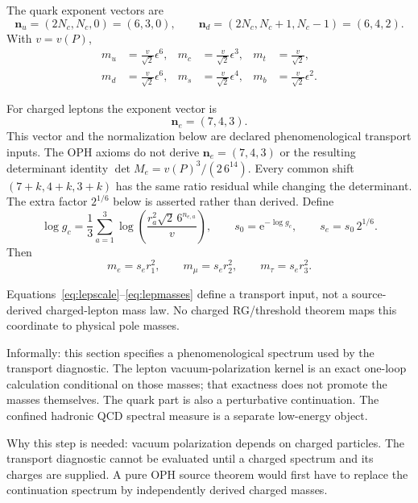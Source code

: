 \documentclass[11pt]{article}
\theoremstyle{remark}
\newcommand{\e}{\mathrm e}
\newcommand{\Nc}{N_c}
\begin{document}
The quark exponent vectors are
\begin{equation}
\bm n_u=(2\Nc,\Nc,0)=(6,3,0),
\qquad
\bm n_d=(2\Nc,\Nc+1,\Nc-1)=(6,4,2).
\label{eq:quarkexponents}
\end{equation}
With \(v=v(P)\),
\begin{align}
m_u&=\frac{v}{\sqrt2}\epsilon^6,
&
m_c&=\frac{v}{\sqrt2}\epsilon^3,
&
m_t&=\frac{v}{\sqrt2},\\
m_d&=\frac{v}{\sqrt2}\epsilon^6,
&
m_s&=\frac{v}{\sqrt2}\epsilon^4,
&
m_b&=\frac{v}{\sqrt2}\epsilon^2.
\label{eq:quarkmasses}
\end{align}

For charged leptons the exponent vector is
\begin{equation}
\bm n_e=(7,4,3).
\label{eq:lepexp}
\end{equation}
This vector and the normalization below are declared phenomenological transport
inputs. The OPH axioms do not derive
\(\bm n_e=(7,4,3)\) or the resulting determinant identity
\(\det M_e=v(P)^3/(2\,6^{14})\). Every common shift
\((7+k,4+k,3+k)\) has the same
ratio residual while changing the determinant.  The extra factor \(2^{1/6}\)
below is asserted rather than derived.
Define
\begin{equation}
\log g_c
=
\frac{1}{3}
\sum_{a=1}^3
\log\!\left(
\frac{r_a^2\sqrt2\,6^{n_{e,a}}}{v}
\right),
\qquad
s_0=\e^{-\log g_c},
\qquad
s_e=s_0\,2^{1/6}.
\label{eq:lepscale}
\end{equation}
Then
\begin{equation}
m_e=s_e r_1^2,
\qquad
m_\mu=s_e r_2^2,
\qquad
m_\tau=s_e r_3^2.
\label{eq:lepmasses}
\end{equation}

Equations~\eqref{eq:lepscale}--\eqref{eq:lepmasses} define a transport input,
not a source-derived charged-lepton mass law. No charged RG/threshold theorem
maps this coordinate to physical pole masses.

Informally: this section specifies a phenomenological spectrum used by the
transport diagnostic.  The lepton vacuum-polarization kernel is an exact
one-loop calculation conditional on those masses; that exactness does not
promote the masses themselves.  The quark part is also a perturbative
continuation. The confined hadronic QCD spectral measure is a separate
low-energy object.

Why this step is needed: vacuum polarization depends on charged particles. The
transport diagnostic cannot be evaluated until a charged spectrum and its
charges are supplied.  A pure OPH source theorem would first have to replace
the continuation spectrum by independently derived charged masses.
\end{document}
